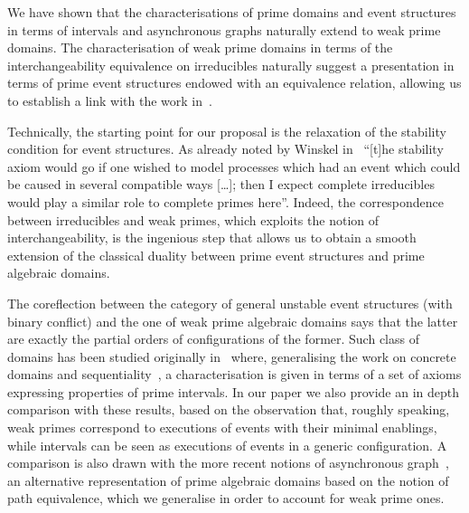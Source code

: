 \documentclass[conference]{IEEEtran}
\begin{document}
We have shown that the  
characterisations of prime domains and event structures in terms of intervals 
and asynchronous graphs naturally extend to weak prime domains. 
The characterisation of weak prime domains in terms of the interchangeability 
equivalence on irreducibles naturally suggest a presentation in terms of prime 
event structures endowed with an equivalence relation, allowing us to establish 
a link with the work in~\cite{win2017,VismeW19}.
%
%


Technically, the starting point for our proposal is the relaxation of the stability
condition for event structures. As already noted by Winskel
in~\cite{Win:ESSCCS} ``[t]he stability axiom would go if one wished to
model processes which had an event which could be caused in several
compatible ways [\ldots]; then I expect complete irreducibles would
play a similar role to complete primes here''.  Indeed, the
correspondence between irreducibles and weak primes, which
exploits the
notion of interchangeability, is the ingenious step that allows us to
obtain a smooth extension of the classical duality between
prime event structures and prime algebraic domains.

The coreflection between the category of general unstable event structures 
(with binary conflict)
and the one of weak prime algebraic domains says that the latter are
exactly the partial orders of configurations of the former. 
Such class of domains has been
studied originally in~\cite{Winskel:phd} where, generalising the work
on concrete domains and sequentiality~\cite{KP:CD}, a characterisation
is given in terms of a set of axioms expressing properties of prime
intervals.
%
%
In our paper we also provide an in depth comparison with these  results,
based on the observation that, roughly speaking, weak primes correspond to executions 
of events with their minimal enablings, while intervals can be seen as executions of 
events in a generic configuration.
%
A comparison is also drawn with the more recent notions of asynchronous graph~\cite{Mel:hab}, 
an alternative representation of prime algebraic domains based on the notion of path equivalence,
which we generalise in order to account for weak prime ones.
%
\end{document}
